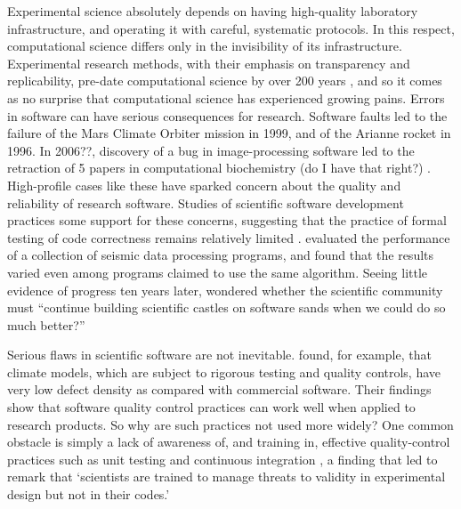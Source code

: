 \documentclass[12pt]{amsart}
\begin{document}
Experimental science absolutely depends on having high-quality laboratory infrastructure, and operating it with careful, systematic protocols. In this respect, computational science differs only in the invisibility of its infrastructure. Experimental research methods, with their emphasis on transparency and replicability, pre-date computational science by over 200 years \citep{wilson2006s,fomel2009reproducible}, and so it comes as no surprise that computational science has experienced growing pains. Errors in software can have serious consequences for research. Software faults led to the failure of the Mars Climate Orbiter mission in 1999, and of the Arianne rocket in 1996. In 2006??, discovery of a bug in image-processing software led to the retraction of 5 papers in computational biochemistry (do I have that right?) \citep{miller2006scientist}. High-profile cases like these have sparked concern about the quality and reliability of research software. Studies of scientific software development practices some support for these concerns, suggesting that the practice of formal testing of code correctness remains relatively limited \citep{post2005computational,wilson2006s,hannay2009scientists,nguyen2010survey,clune2011software,howison2011scientific,prabhu2011survey,kanewala2014testing,heaton2015claims}. \citet{hatton1997t} evaluated the performance of a collection of seismic data processing programs, and found that the results varied even among programs claimed to use the same algorithm. Seeing little evidence of progress ten years later, \citet{hatton2007chimera} wondered whether the scientific community must ``continue building scientific castles on software sands when we could do so much better?''

Serious flaws in scientific software are not inevitable. \citet{pipitone2012assessing} found, for example, that climate models, which are subject to rigorous testing and quality controls, have very low defect density as compared with commercial software. Their findings show that software quality control practices can work well when applied to research products. So why are such practices not used more widely? One common obstacle is simply a lack of awareness of, and training in, effective quality-control practices such as unit testing and continuous integration \citep{wilson2006s,faulk2009scientific,hannay2009scientists,kanewala2014testing}, a finding that led \citet{faulk2009scientific} to remark that `scientists are trained to manage threats to validity in experimental design but not in their codes.'
\end{document}
